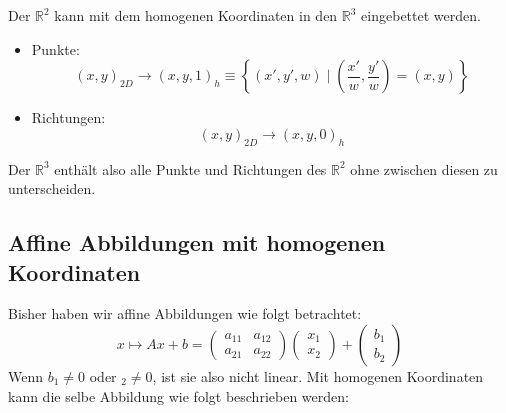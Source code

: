 Der $\mathbb{R}^2$ kann mit dem homogenen Koordinaten in den $\mathbb{R}^3$ eingebettet werden.
\begin{itemize}
  \item Punkte:
  \[
    (x, y)_{2D} \to (x, y, 1)_h \equiv
    \left\{(x', y', w) \mid \left(\frac{x'}{w}, \frac{y'}{w}\right) = (x, y)\right\}
  \]
  \item Richtungen:
  \[
    (x, y)_{2D} \to (x, y, 0)_h
  \]
\end{itemize}
Der $\mathbb{R}^3$ enthält also alle Punkte und Richtungen des $\mathbb{R}^2$ ohne zwischen diesen zu unterscheiden.

\subsection{Affine Abbildungen mit homogenen Koordinaten}
Bisher haben wir affine Abbildungen wie folgt betrachtet:
\[
  x \mapsto Ax + b =
  \begin{pmatrix}
    a_{11} & a_{12} \\
    a_{21} & a_{22}
  \end{pmatrix}
  \begin{pmatrix}
    x_1 \\
    x_2
  \end{pmatrix}
  +
  \begin{pmatrix}
    b_1 \\
    b_2
  \end{pmatrix}
\]
Wenn $b_1 \neq 0$ oder $_2 \neq 0$, ist sie also nicht linear.
Mit homogenen Koordinaten kann die selbe Abbildung wie folgt beschrieben werden:
